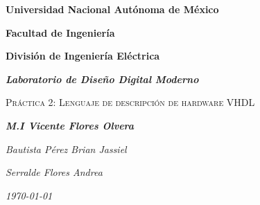 \documentclass[letterpaper]{article} %
\begin{document}
    \begin{figure}[H]
        \begin{titlepage}%
            
            \centering
            \hspace{7cm}

            \vspace{1cm}
                                    
            \centering
            {\bfseries\LARGE Universidad Nacional Aut\'onoma de M\'exico \par}
            \vspace{1cm}
            {\bfseries\LARGE Facultad de Ingenier\'ia \par}
            \vspace{1cm}
            {\bfseries\LARGE Divisi\'on de Ingenier\'ia El\'ectrica\par}
            \vspace{1cm}
            {\itshape\Large \textbf{Laboratorio de Diseño Digital Moderno\\} \par} 
            \vspace{1cm}
            {\scshape\LARGE{Pr\'actica 2: Lenguaje de descripci\'on de hardware VHDL\\} \par}
            \vspace{1cm}
            {\itshape\Large \textbf{M.I Vicente Flores Olvera\\} \par}
            \vspace{1cm}
            \vfill
            {\itshape\Large Bautista P\'erez Brian Jassiel \\\par}
            {\itshape\Large Serralde Flores Andrea \\\par}
            \vfill
            \vspace{1cm}
            {\itshape\Large \today\par}
            
        \end{titlepage}
	\end{figure}
    \newpage
\end{document}
